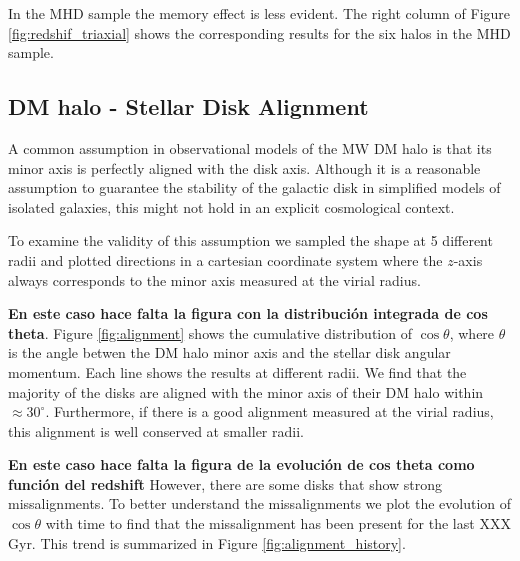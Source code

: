 \documentclass[a4paper,fleqn,usenatbib]{mnras}
\begin{document}
In the MHD sample the memory effect is less evident. 
The right column of Figure \ref{fig:redshif_triaxial} shows the
corresponding results for the six halos in the MHD sample.



\subsection{DM halo - Stellar Disk Alignment}


A common assumption in observational models of the MW DM halo is that
its minor axis is perfectly aligned with the disk axis.
Although it is a reasonable assumption to guarantee the
stability of the galactic disk in simplified models of isolated
galaxies, this might not hold in an explicit cosmological context.

To examine the validity of this assumption  we sampled the shape at 5
different radii and plotted  directions in a cartesian coordinate
system where the $z$-axis always corresponds to the minor axis
measured at the virial radius.

{\bf En este caso hace falta la figura con la distribuci\'on integrada de cos theta}.
Figure \ref{fig:alignment} shows the cumulative distribution of
$\cos\theta$, where $\theta$ is the angle betwen the DM halo minor
axis and the stellar disk angular momentum.  
Each line shows the results at different radii.
We find that the majority of the disks are aligned with the minor axis
of their DM halo within $\approx 30^{\circ}$. 
Furthermore, if there is a good alignment measured at the virial
radius, this alignment is well conserved at smaller radii.

{\bf En este caso hace falta la figura de la evoluci\'on de cos theta
  como funci\'on del redshift}
However, there are some disks that show strong missalignments. 
To better understand the missalignments we plot the evolution of
$\cos\theta$ with time to find that the missalignment has been present
for the last XXX Gyr.
This trend is summarized in Figure \ref{fig:alignment_history}.

\end{document}

